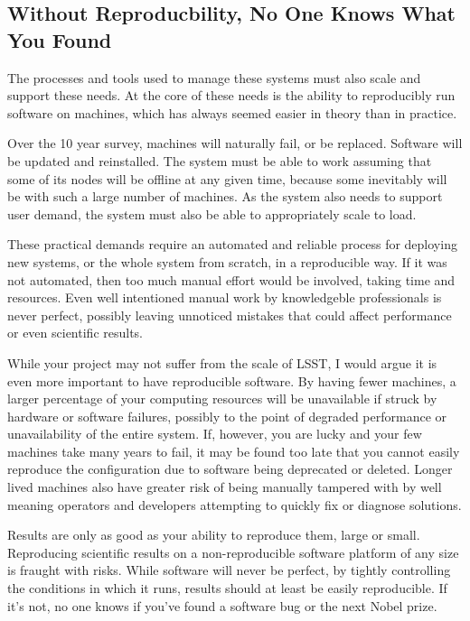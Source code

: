 \documentclass[11pt,twoside]{article}
\begin{document}
\subsection{Without Reproducbility, No One Knows What You Found}

The processes and tools used to manage these systems must also scale and
support these needs.  At the core of these needs is the ability to
reproducibly run software on machines, which has always seemed easier
in theory than in practice.

Over the 10 year survey, machines will naturally fail, or be replaced.
Software will be updated and reinstalled.  The system
must be able to work assuming that some of its nodes will be offline at
any given time, because some inevitably will be with such a large number
of machines.  As the system also needs to support user demand, the system
must also be able to appropriately scale to load.

These practical demands require an automated and reliable process for
deploying new systems, or the whole system from scratch, in a reproducible
way.  If it was not automated, then too much manual effort would be involved,
taking time and resources.  Even well intentioned manual work by knowledgeble
professionals is never perfect, possibly leaving unnoticed mistakes that could
affect performance or even scientific results.

While your project may not suffer from the scale of LSST, I would argue it is
even more important to have reproducible software.  By having fewer machines,
a larger percentage of your computing resources will be unavailable if struck by
hardware or software failures, possibly to the point of degraded performance
or unavailability of the entire system.  If, however, you are lucky and your
few machines take many years to fail, it may be found too late that you cannot
easily reproduce the configuration due to software being deprecated or deleted.
Longer lived machines also have greater risk of being manually tampered with by
well meaning operators and developers attempting to quickly fix or diagnose
solutions.

Results are only as good as your ability to reproduce them, large or small.
Reproducing scientific results on a non-reproducible software platform of any size
is fraught with risks.  While software will never be perfect, by tightly controlling
the conditions in which it runs, results should at least be easily reproducible.
If it's not, no one knows if you've found a software bug or the next Nobel prize.
\end{document}

